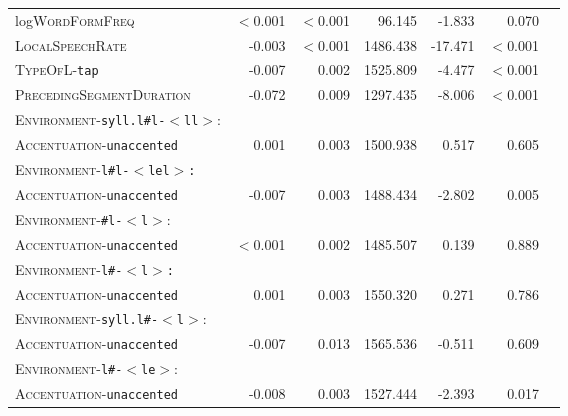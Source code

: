 \begin{table}
{\begin{tabular} {lrrrrrr}
		log\textsc{WordFormFreq }& \color{lsLightGray} $<$0.001 & \color{lsLightGray} $<$0.001 & \color{lsLightGray} 96.145 & \color{lsLightGray} -1.833 & \color{lsLightGray} 0.070 \\ 
		
		\textsc{LocalSpeechRate} & -0.003 &$<$0.001  & 1486.438 & -17.471 &$<$0.001 \\ 
		
		
		\textsc{TypeOfL}-\texttt{tap} & -0.007 & 0.002 & 1525.809 & -4.477 & $<$0.001 \\ 
		
		\textsc{PrecedingSegmentDuration} & -0.072 & 0.009 & 1297.435 & -8.006 & $<$0.001 \\ 
		
		\textsc{Environment}-\texttt{syll.l\#l-$<$ll$>$}:&&&&&\\
		\textsc{Accentuation}-\texttt{unaccented} & \color{lsLightGray} 0.001 & \color{lsLightGray} 0.003 & \color{lsLightGray} 1500.938 &\color{lsLightGray}  0.517 & \color{lsLightGray} 0.605 \\ 
		
		\textsc{Environment}-\texttt{l\#l-$<$lel$>$:}&&&&&\\
		\textsc{Accentuation}-\texttt{unaccented} & -0.007 & 0.003 & 1488.434 & -2.802 & 0.005 \\
		
		\textsc{Environment}-\texttt{\#l-$<$l$>$}:&&&&&\\
		\textsc{Accentuation}-\texttt{unaccented} & \color{lsLightGray} $<$0.001  & \color{lsLightGray} 0.002 & \color{lsLightGray} 1485.507 & \color{lsLightGray} 0.139 & \color{lsLightGray} 0.889 \\ 
		
		\textsc{Environment}-\texttt{l\#-$<$l$>$:}&&&&&\\
		\textsc{Accentuation}-\texttt{unaccented} & \color{lsLightGray} 0.001 & \color{lsLightGray} 0.003 & \color{lsLightGray} 1550.320 &  \color{lsLightGray} 0.271 &\color{lsLightGray}  0.786 \\ 
		
		\textsc{Environment}-\texttt{syll.l\#-$<$l$>$}:&&&&&\\
		\textsc{Accentuation}-\texttt{unaccented} &\color{lsLightGray}  -0.007 &\color{lsLightGray}  0.013 & \color{lsLightGray} 1565.536 &\color{lsLightGray}  -0.511 &\color{lsLightGray}  0.609 \\ 
		
		\textsc{Environment}-\texttt{l\#-$<$le$>$}:&&&&&\\
		\textsc{Accentuation}-\texttt{unaccented} & -0.008 & 0.003 & 1527.444 & -2.393 & 0.017 \\ 
		

\end{tabular}}
\end{table}
